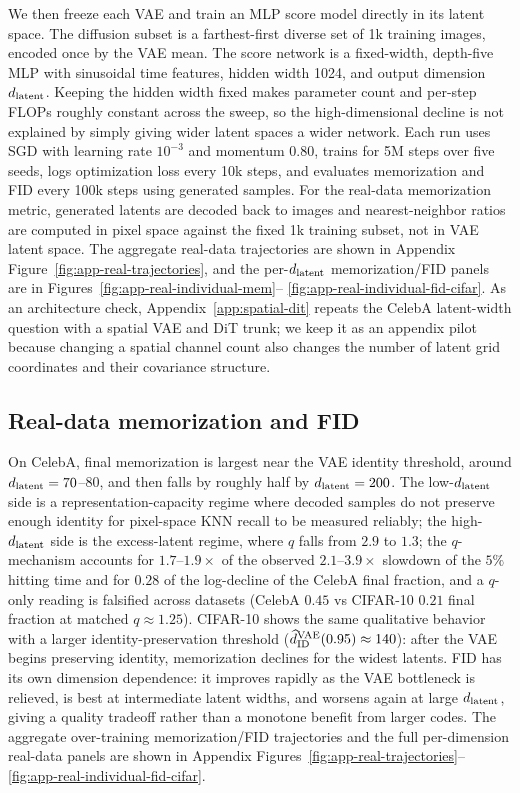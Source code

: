 We then freeze each VAE and train an MLP score model directly in its latent space. The diffusion subset is a farthest-first diverse set of 1k training images, encoded once by the VAE mean. The score network is a fixed-width, depth-five MLP with sinusoidal time features, hidden width 1024, and output dimension $d_{\mathrm{latent}}$. Keeping the hidden width fixed makes parameter count and per-step FLOPs roughly constant across the sweep, so the high-dimensional decline is not explained by simply giving wider latent spaces a wider network. Each run uses SGD with learning rate $10^{-3}$ and momentum $0.80$, trains for 5M steps over five seeds, logs optimization loss every 10k steps, and evaluates memorization and FID every 100k steps using generated samples. For the real-data memorization metric, generated latents are decoded back to images and nearest-neighbor ratios are computed in pixel space against the fixed 1k training subset, not in VAE latent space. The aggregate real-data trajectories are shown in Appendix Figure~\ref{fig:app-real-trajectories}, and the per-$d_{\mathrm{latent}}$ memorization/FID panels are in Figures~\ref{fig:app-real-individual-mem}-- \ref{fig:app-real-individual-fid-cifar}. As an architecture check, Appendix~\ref{app:spatial-dit} repeats the CelebA latent-width question with a spatial VAE and DiT trunk; we keep it as an appendix pilot because changing a spatial channel count also changes the number of latent grid coordinates and their covariance structure.

\subsection{Real-data memorization and FID}
\label{sec:real-mem-fid}

On CelebA, final memorization is largest near the VAE identity threshold, around $d_{\mathrm{latent}}=70$--$80$, and then falls by roughly half by $d_{\mathrm{latent}}=200$. The low-$d_{\mathrm{latent}}$ side is a representation-capacity regime where decoded samples do not preserve enough identity for pixel-space KNN recall to be measured reliably; the high-$d_{\mathrm{latent}}$ side is the excess-latent regime, where $q$ falls from $2.9$ to $1.3$; the $q$-mechanism accounts for $1.7$--$1.9\times$ of the observed $2.1$--$3.9\times$ slowdown of the $5\%$ hitting time and for $0.28$ of the log-decline of the CelebA final fraction, and a $q$-only reading is falsified across datasets (CelebA $0.45$ vs CIFAR-10 $0.21$ final fraction at matched $q\approx1.25$). CIFAR-10 shows the same qualitative behavior with a larger identity-preservation threshold ($\widehat d_{\rm ID}^{\rm VAE}(0.95)\approx 140$): after the VAE begins preserving identity, memorization declines for the widest latents. FID has its own dimension dependence: it improves rapidly as the VAE bottleneck is relieved, is best at intermediate latent widths, and worsens again at large $d_{\mathrm{latent}}$, giving a quality tradeoff rather than a monotone benefit from larger codes. The aggregate over-training memorization/FID trajectories and the full per-dimension real-data panels are shown in Appendix Figures~\ref{fig:app-real-trajectories}-- \ref{fig:app-real-individual-fid-cifar}.
